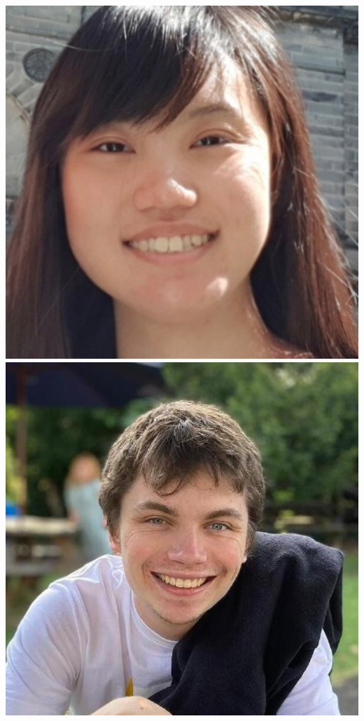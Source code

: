 \documentclass[aspectratio=169]{beamer}
\begin{document}
\begin{frame}
{            \includegraphics[width=0.1\textheight]{figures/students/dily_ong.jpg}%
            \includegraphics[width=0.1\textheight]{figures/students/harry_bevins.jpg}%
}
\end{frame}
\end{document}
